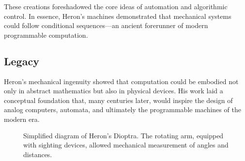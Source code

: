 These creations foreshadowed the core ideas of automation and algorithmic control. In essence, Heron's machines demonstrated that mechanical systems could follow conditional sequences---an ancient forerunner of modern programmable computation.

\subsection{Legacy}

Heron's mechanical ingenuity showed that computation could be embodied not only in abstract mathematics but also in physical devices. His work laid a conceptual foundation that, many centuries later, would inspire the design of analog computers, automata, and ultimately the programmable machines of the modern era.

\begin{figure}[H]
    \centering
    \caption{Simplified diagram of Heron's Dioptra. The rotating arm, equipped with sighting devices, allowed mechanical measurement of angles and distances.}
    \label{fig:dioptra}
\end{figure}
